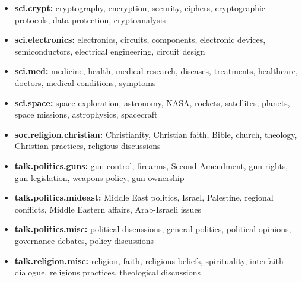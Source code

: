 \documentclass[sigconf,nonacm]{acmart}
\begin{document}
\begin{itemize}
\item \textbf{sci.crypt:} cryptography, encryption, security, ciphers, crypto\-graphic protocols, data protection, crypto\-analysis

\item \textbf{sci.electronics:} electronics, circuits, components, electronic devices, semi\-conductors, electrical engineering, circuit design

\item \textbf{sci.med:} medicine, health, medical research, diseases, treatments, health\-care, doctors, medical conditions, symptoms

\item \textbf{sci.space:} space exploration, astronomy, NASA, rockets, satellites, planets, space missions, astro\-physics, spacecraft

\item \textbf{soc.religion.christian:} Christianity, Christian faith, Bible, church, theology, Christian practices, religious discussions

\item \textbf{talk.politics.guns:} gun control, firearms, Second Amendment, gun rights, gun legislation, weapons policy, gun ownership

\item \textbf{talk.politics.mideast:} Middle East politics, Israel, Palestine, regional conflicts, Middle Eastern affairs, Arab-Israeli issues

\item \textbf{talk.politics.misc:} political discussions, general politics, political opinions, governance debates, policy discussions

\item \textbf{talk.religion.misc:} religion, faith, religious beliefs, spirituality, inter\-faith dialogue, religious practices, theological discussions
\end{itemize}
\end{document}
